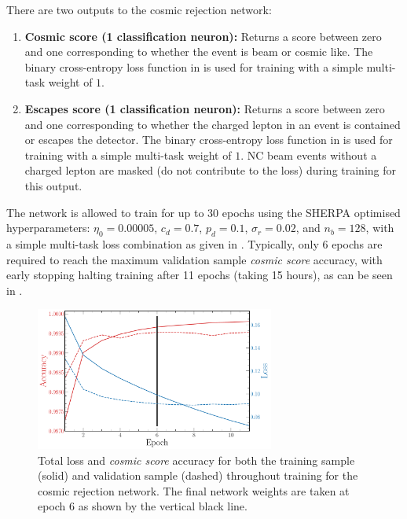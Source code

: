 There are two outputs to the cosmic rejection network:
\begin{enumerate}
    \item \textbf{Cosmic score (1 classification neuron):} Returns a score between zero and one
          corresponding to whether the event is beam or cosmic like. The binary cross-entropy loss
          function in  is used for training with a simple
          multi-task weight of $1$.
    \item \textbf{Escapes score (1 classification neuron):} Returns a score between zero and one
          corresponding to whether the charged lepton in an event is contained or escapes the
          detector. The binary cross-entropy loss function in
           is used for training with a simple multi-task
          weight of $1$. NC beam events without a charged lepton are masked (do not contribute to
          the loss) during training for this output.
\end{enumerate}

The network is allowed to train for up to 30 epochs using the SHERPA optimised hyperparameters:
$\eta_{0}=0.00005$, $c_{d}=0.7$, $p_{d}=0.1$, $\sigma_{r}=0.02$, and $n_{b}=128$, with a simple
multi-task loss combination as given in . Typically, only 6 epochs
are required to reach the maximum validation sample \emph{cosmic score} accuracy, with early
stopping halting training after 11 epochs (taking 15 hours), as can be seen in
.

\begin{figure} %
    \includegraphics[width=0.7\textwidth]{diagrams/7-results/final_cosmic_history.pdf}
    \caption[Loss and accuracy throughout training for the cosmic rejection network]
    {Total loss and \emph{cosmic score} accuracy for both the training sample (solid) and
        validation sample (dashed) throughout training for the cosmic rejection network. The final
        network weights are taken at epoch 6 as shown by the vertical black line.}
    \label{fig:final_cosmic_history}
\end{figure}

